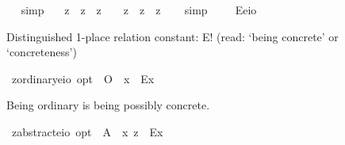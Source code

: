 \begin{isabellebody}
\isadelimproof
\ %
\endisadelimproof
%
\isatagproof
{}\isamarkupfalse%
\ simp\ \isamarkupfalse%
%
\endisatagproof
{\isafoldproof}%
%
\isadelimproof
%
\endisadelimproof
\isanewline
{}\isamarkupfalse%
\ {\isachardoublequoteopen}{\isacharparenleft}{\isacharcomma}{\isasymphi}{\isacharcomma}\ {\isasymand}\isactrlsup z\ {\isacharcomma}{\isasympsi}{\isacharcomma}\ {\isasymequiv}\isactrlsup z\ {\isacharcomma}{\isasymphi}{\isacharcomma}\ {\isasymand}\isactrlsup z\ {\isacharcomma}{\isasympsi}{\isacharcomma}{\isacharparenright}\ {\isasymequiv}\ {\isacharparenleft}{\isacharcomma}{\isasymphi}{\isacharcomma}\ {\isasymand}\isactrlsup z\ {\isacharparenleft}{\isacharcomma}{\isasympsi}{\isacharcomma}\ {\isasymequiv}\isactrlsup z\ {\isacharcomma}{\isasymphi}{\isacharcomma}{\isacharparenright}\ {\isasymand}\isactrlsup z\ {\isacharcomma}{\isasympsi}{\isacharcomma}{\isacharparenright}{\isachardoublequoteclose}%
\isadelimproof
\ %
\endisadelimproof
%
\isatagproof
{}\isamarkupfalse%
\ simp%
\endisatagproof
{\isafoldproof}%
%
\isadelimproof
%
\endisadelimproof
\ \isamarkupfalse%
%
\isadelimproof
\ %
\endisadelimproof
%
\isatagproof
{}\isamarkupfalse%
%
\endisatagproof
{\isafoldproof}%
%
\isadelimproof
%
\endisadelimproof
%
\isamarkuptrue%
\isamarkupfalse%
\ E{\isacharcolon}{\isacharcolon}{\isachardoublequoteopen}{\isacharparenleft}e{\isasymRightarrow}io{\isacharparenright}{\isachardoublequoteclose}%
\begin{isamarkuptext}%
Distinguished 1-place relation constant: E! (read: ‘being concrete’ or ‘concreteness’)%
\end{isamarkuptext}%
\isamarkuptrue%
\isamarkupfalse%
\ z{\isacharunderscore}ordinary{\isacharcolon}{\isacharcolon}{\isachardoublequoteopen}{\isacharparenleft}e{\isasymRightarrow}io{\isacharparenright}\ opt{\isachardoublequoteclose}\ \ {\isachardoublequoteopen}O\isactrlsup {\isacharbang}\ {\isasymequiv}\ {\isasymlambda}x{\isachardot}\ {\isasymdiamond}\ {\isacharless}{\isachardot}E{\isachardot}{\isasymbullet}{\isachardot}x{\isachardot}{\isachargreater}{\isacharparenright}{\isachardoublequoteclose}%
\begin{isamarkuptext}%
Being ordinary is being possibly concrete.%
\end{isamarkuptext}%
\isamarkuptrue%
\isamarkupfalse%
\ z{\isacharunderscore}abstract{\isacharcolon}{\isacharcolon}{\isachardoublequoteopen}{\isacharparenleft}e{\isasymRightarrow}io{\isacharparenright}\ opt{\isachardoublequoteclose}\ \ {\isachardoublequoteopen}A\isactrlsup {\isacharbang}\ {\isasymequiv}\ {\isasymlambda}x{\isachardot}\ {\isasymnot}\isactrlsup z\ {\isacharparenleft}{\isasymdiamond}\ {\isacharless}{\isachardot}E{\isachardot}{\isasymbullet}{\isachardot}x{\isachardot}{\isachargreater}{\isacharparenright}{\isacharparenright}{\isachardoublequoteclose}%

\end{isabellebody}
